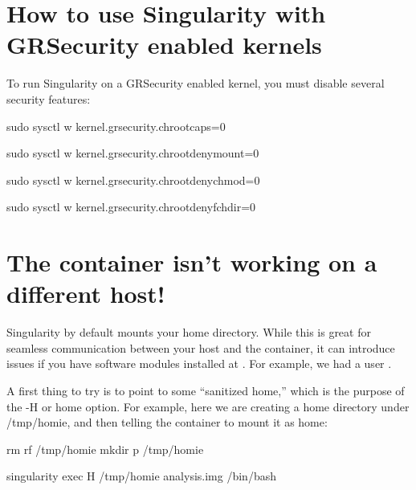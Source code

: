 \documentclass[letterpaper,10pt,english]{sphinxmanual}
\begin{document}
\section{How to use Singularity with GRSecurity enabled kernels}
\label{\detokenize{troubleshooting:how-to-use-singularity-with-grsecurity-enabled-kernels}}
\begin{DUlineblock}{0em}
\item[] To run Singularity on a GRSecurity enabled kernel, you must disable
several security features:
\end{DUlineblock}

%
\begin{sphinxVerbatim}[commandchars=\\\{\}]
\PYGZdl{} sudo sysctl \PYGZhy{}w kernel.grsecurity.chroot\PYGZus{}caps=0

\PYGZdl{} sudo sysctl \PYGZhy{}w kernel.grsecurity.chroot\PYGZus{}deny\PYGZus{}mount=0

\PYGZdl{} sudo sysctl \PYGZhy{}w kernel.grsecurity.chroot\PYGZus{}deny\PYGZus{}chmod=0

\PYGZdl{} sudo sysctl \PYGZhy{}w kernel.grsecurity.chroot\PYGZus{}deny\PYGZus{}fchdir=0
\end{sphinxVerbatim}


\section{The container isn’t working on a different host!}
\label{\detokenize{troubleshooting:the-container-isnt-working-on-a-different-host}}
Singularity by default mounts your home directory. While this is great
for seamless communication between your host and the container, it can
introduce issues if you have software modules installed at . For
example, we had a user .

A first thing to try is to point to some “sanitized home,” which is
the purpose of the -H or \textendash{}home option. For example, here we are
creating a home directory under /tmp/homie, and then telling the
container to mount it as home:

%
\begin{sphinxVerbatim}[commandchars=\\\{\}]
rm \PYGZhy{}rf /tmp/homie \PYGZam{}\PYGZam{} mkdir \PYGZhy{}p /tmp/homie \PYGZam{}\PYGZam{} \PYGZbs{}

singularity exec \PYGZhy{}H /tmp/homie analysis.img /bin/bash
\end{sphinxVerbatim}
\end{document}
